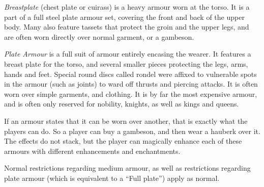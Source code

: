 \emph{Breastplate} (chest plate or cuirass) is a heavy armour worn at the
torso. It is a part of a full steel plate armour set, covering the front and
back of the upper body. Many also feature tassets that protect the groin and
the upper legs, and are often worn directly over normal garment, or a
gambeson.

\emph{Plate Armour} is a full suit of armour entirely encasing the wearer. It
features a breast plate for the torso, and several smaller pieces protecting
the legs, arms, hands and feet. Special round discs called rondel were affixed
to vulnerable spots in the armour (such as joints) to ward off thrusts and
piercing attacks. It is often worn over simple garments, and clothing. It is
by far the most expensive armour, and is often only reserved for nobility,
knights, as well as kings and queens.

\begin{note}
  If an armour states that it can be worn over another, that is exactly what
  the players can do. So a player can buy a gambeson, and then wear a hauberk
  over it. The effects do not stack, but the player can magically enhance each
  of these armours with different enhancements and enchantments.

  Normal restrictions regarding medium armour, as well as restrictions regarding
  plate armour (which is equivalent to a ``Full plate'') apply as normal.
\end{note}
